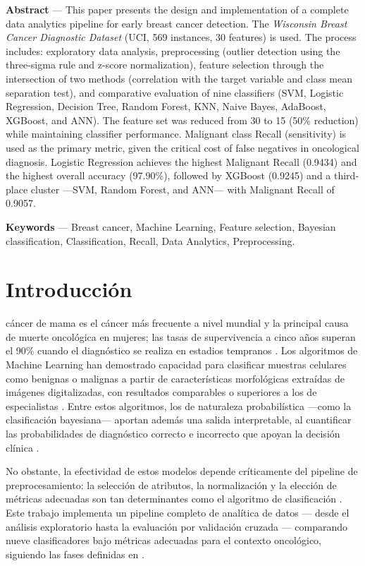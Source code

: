 \documentclass[journal]{IEEEtran}
\begin{document}
\smallskip
{}
\noindent\textbf{Abstract} ---
This paper presents the design and implementation of a complete data analytics pipeline for early breast cancer detection. The \textit{Wisconsin Breast Cancer Diagnostic Dataset} (UCI, 569 instances, 30 features) is used. The process includes: exploratory data analysis, preprocessing (outlier detection using the three-sigma rule and z-score normalization), feature selection through the intersection of two methods (correlation with the target variable and class mean separation test), and comparative evaluation of nine classifiers (SVM, Logistic Regression, Decision Tree, Random Forest, KNN, Naive Bayes, AdaBoost, XGBoost, and ANN). The feature set was reduced from 30 to 15 (50\% reduction) while maintaining classifier performance. Malignant class Recall (sensitivity) is used as the primary metric, given the critical cost of false negatives in oncological diagnosis. Logistic Regression achieves the highest Malignant Recall (0.9434) and the highest overall accuracy (97.90\%), followed by XGBoost (0.9245) and a third-place cluster —SVM, Random Forest, and ANN— with Malignant Recall of 0.9057.

\smallskip
\noindent\textbf{Keywords} --- Breast cancer, Machine Learning, Feature selection, Bayesian classification, Classification, Recall, Data Analytics, Preprocessing.

\section{Introducción}

 cáncer de mama es el cáncer más frecuente a nivel mundial y la principal causa de muerte oncológica en mujeres; las tasas de supervivencia a cinco años superan el 90\% cuando el diagnóstico se realiza en estadios tempranos \cite{who2023}. Los algoritmos de Machine Learning han demostrado capacidad para clasificar muestras celulares como benignas o malignas a partir de características morfológicas extraídas de imágenes digitalizadas, con resultados comparables o superiores a los de especialistas \cite{kourou2015, asri2016}. Entre estos algoritmos, los de naturaleza probabilística —como la clasificación bayesiana— aportan además una salida interpretable, al cuantificar las probabilidades de diagnóstico correcto e incorrecto que apoyan la decisión clínica \cite{bayesian_med}.

No obstante, la efectividad de estos modelos depende críticamente del pipeline de preprocesamiento: la selección de atributos, la normalización y la elección de métricas adecuadas son tan determinantes como el algoritmo de clasificación \cite{remeseiro2019, garcia2015}. Este trabajo implementa un pipeline completo de analítica de datos — desde el análisis exploratorio hasta la evaluación por validación cruzada — comparando nueve clasificadores bajo métricas adecuadas para el contexto oncológico, siguiendo las fases definidas en \cite{curso_ud}.
\end{document}
